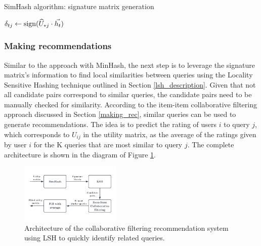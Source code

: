 \begin{algorithm}[h]
    \caption{SimHash algorithm: signature matrix generation} 
    \begin{algorithmic}[1]
                \State $\delta_{tj} \gets \operatorname{sign}(\widehat{U}_{*j} \cdot \vec{h_t})$
            \EndFor
        \EndFor
    \end{algorithmic} 
    \label{simhash_alg}
\end{algorithm}

\subsubsection{Making recommendations} Similar to the approach with MinHash, the next step is to leverage the signature matrix's information to find local similarities between queries using the Locality Sensitive Hashing technique outlined in Section \ref{lsh_description}. Given that not all candidate pairs correspond to similar queries, the candidate pairs need to be manually checked for similarity. According to the item-item collaborative filtering approach discussed in Section \ref{making_rec}, similar queries can be used to generate recommendations. The idea is to predict the rating of users $i$ to query $j$, which corresponds to $U_{ij}$ in the utility matrix, as the average of the ratings given by user $i$ for the K queries that are most similar to query $j$. The complete architecture is shown in the diagram of Figure \ref{fig:cf_lsh}.
\begin{figure}[H]
    \centering
    \includegraphics[width=0.43\textwidth]{imgs/cf_lsh_diagram.pdf}
    \caption{\normalfont Architecture of the collaborative filtering recommendation system using LSH to quickly identify related queries.}
    \label{fig:cf_lsh}
\end{figure}


